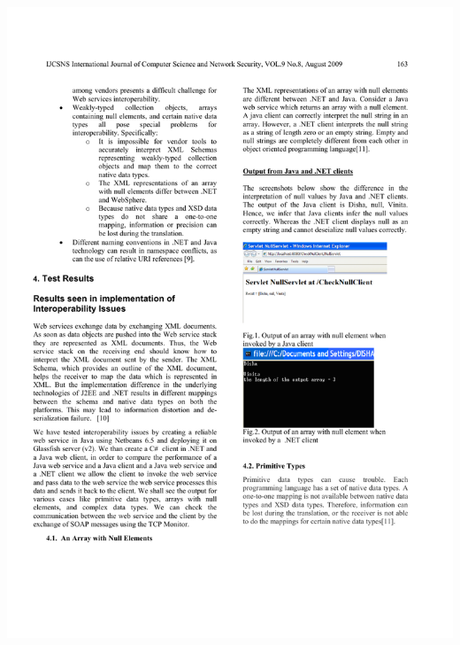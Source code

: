 \documentclass{beamer}
\newcommand{\linespace}{\vskip 0.25cm}
\begin{document}
\begin{frame}
\begin{columns}
  \begin{column}{0.5\textwidth}
  \includegraphics[scale=0.9]{graphics/JavaNullSmall.pdf}
  \linespace

\end{column}
\end{columns}
\end{frame}
\end{document}
